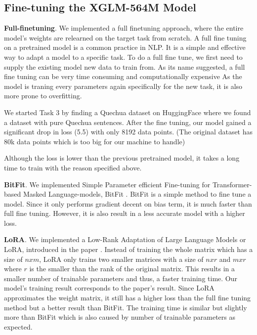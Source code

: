 \documentclass[11pt]{article}
\newcommand{\customsection}[1]{
  \noindent\textbf{#1}.\vspace{2mm}
}
\begin{document}
\subsection{Fine-tuning the XGLM-564M Model}
\customsection{Full-finetuning} We implemented a full finetuning approach, where the entire model's weights are relearned on the target task from scratch.
A full fine tuning on a pretrained model is a common practice in NLP. It is a simple and effective way to adapt a model to a specific task.
To do a full fine tune, we first need to supply the existing model new data to train from.
As its name suggested, a full fine tuning can be very time consuming and computationally expensive
As the model is traning every parameters again specifically for the new task, it is also more prone to overfitting.

We started Task 3 by finding a Quechua dataset on HuggingFace
where we found a dataset with pure Quechua sentences.
After the fine tuning, our model gained a significant drop in loss (5.5) with only 8192 data points.
(The original dataset has 80k data points which is too big for our machine to handle)

Although the loss is lower than the previous pretrained model,
it takes a long time to train with the reason specified above.

\customsection{BitFit} We implemented Simple Parameter efficient Fine-tuning
for Transformer-based Masked Language-models, BitFit \cite{zaken2022bitfit}.
BitFit is a simple method to fine tune a model. 
Since it only performs gradient decent on bias term, it is much faster than full fine tuning.
However, it is also result in a less accurate model with a higher loss.

\customsection{LoRA} We implemented a Low-Rank Adaptation of Large Language Models or LoRA, introduced in the paper \cite{hu2021lora}.
Instead of training the whole matrix which has a size of $nxm$, LoRA only trains two smaller matrices with a size of $nxr$ and $mxr$
where $r$ is the smaller than the rank of the original matrix.
This results in a smaller number of trainable parameters and thus, a faster training time.
Our model's training result corresponds to the paper's result.
Since LoRA approximates the weight matrix, it still has a higher loss than the full fine tuning method but 
a better result than BitFit.
The training time is similar but slightly more than BitFit which is also caused by number of trainable parameters as expected.
\end{document}
